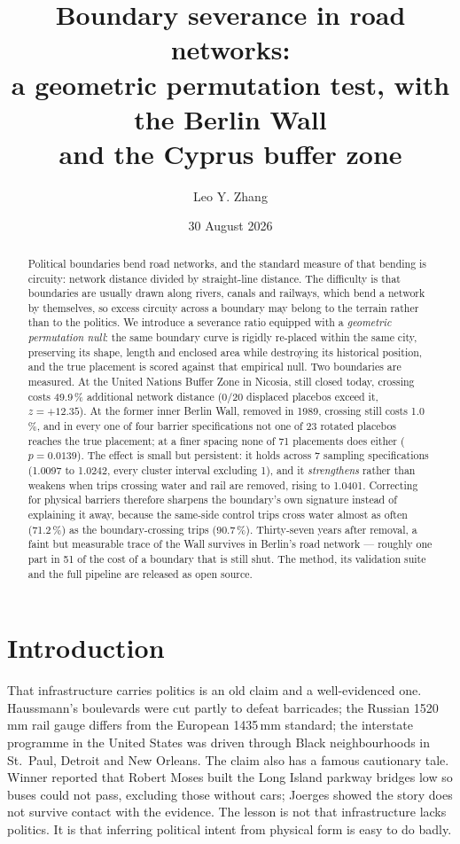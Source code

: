 \documentclass[11pt,a4paper]{article}
\title{\bfseries Boundary severance in road networks:\\
a geometric permutation test, with the Berlin Wall\\ and the Cyprus buffer zone}
\author{Leo Y. Zhang}
\date{30 August 2026}
\begin{document}
\maketitle

\begin{abstract}
\noindent
Political boundaries bend road networks, and the standard measure of that
bending is circuity: network distance divided by straight-line distance. The
difficulty is that boundaries are usually drawn along rivers, canals and
railways, which bend a network by themselves, so excess circuity across a
boundary may belong to the terrain rather than to the politics. We introduce a
severance ratio equipped with a \emph{geometric permutation null}: the same
boundary curve is rigidly re-placed within the same city, preserving its shape,
length and enclosed area while destroying its historical position, and the true
placement is scored against that empirical null. Two boundaries are measured.
At the United Nations Buffer Zone in Nicosia, still closed today, crossing costs
49.9\,\% additional network distance
(0/20 displaced placebos exceed it, $z = +12.35$).
At the former inner Berlin Wall, removed in 1989, crossing still costs
1.0\,\%, and in every one of four barrier specifications not one of
23 rotated placebos reaches the true placement; at a finer spacing
none of 71 placements does either ($p = 0.0139$). The effect is small
but persistent: it holds across 7 sampling specifications
(1.0097 to 1.0242, every cluster interval excluding 1), and it
\emph{strengthens} rather than weakens when trips crossing water and rail are
removed, rising to 1.0401. Correcting for physical barriers therefore
sharpens the boundary's own signature instead of explaining it away, because
the same-side control trips cross water almost as often
(71.2\,\%) as the boundary-crossing trips
(90.7\,\%). Thirty-seven years after removal, a faint but measurable
trace of the Wall survives in Berlin's road network --- roughly one part in
51 of the cost of a boundary that is still shut. The method, its validation suite and
the full pipeline are released as open source.
\end{abstract}

\section{Introduction}

That infrastructure carries politics is an old claim and a well-evidenced one.
Haussmann's boulevards were cut partly to defeat barricades; the Russian
1520\,mm rail gauge differs from the European 1435\,mm standard; the interstate
programme in the United States was driven through Black neighbourhoods in
St.\ Paul, Detroit and New Orleans. The claim also has a famous cautionary tale.
Winner \cite{winner1980} reported that Robert Moses built the Long Island
parkway bridges low so buses could not pass, excluding those without cars;
Joerges \cite{joerges1999} showed the story does not survive contact with the
evidence. The lesson is not that infrastructure lacks politics. It is that
inferring political intent from physical form is easy to do badly.
\end{document}

